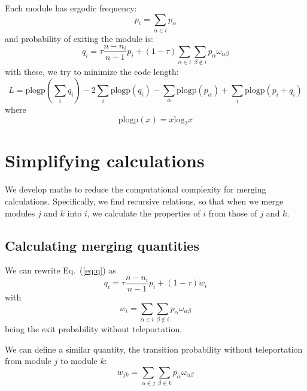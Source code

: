 \documentclass[12pt,a4paper]{article}
\begin{document}
Each module has ergodic frequency:
\begin{equation}
    p_i = \sum_{\alpha\in i}p_\alpha
\end{equation}
and probability of exiting the module is:
\begin{equation}
    q_i = \tau\frac{n-n_i}{n-1}p_i +(1-\tau)\sum_{\alpha\in i}\sum_{\beta\notin i}p_\alpha\omega_{\alpha\beta}
\label{eq:q}
\end{equation}
with these, we try to minimize the code length:
\begin{equation}
    L =
    \mathrm{plogp}\left( \sum_iq_i \right)
    -2\sum_i\mathrm{plogp}\left(q_i\right)
    -\sum_\alpha \mathrm{plogp}(p_\alpha)
    +\sum_i\mathrm{plogp}\left( p_i+q_i \right)
\label{eq:L}
\end{equation}
where
\begin{equation}
    \mathrm{plogp}(x) = x \mathrm{log}_2 x
\end{equation}

\section{Simplifying calculations}

We develop maths to reduce the computational complexity for merging calculations. Specifically, we find recursive relations, so that when we merge modules \(j\) and \(k\) into \(i\), we calculate the properties of \(i\) from those of \(j\) and \(k\).

\subsection{Calculating merging quantities}

We can rewrite Eq.~(\ref{eq:q}) as
\begin{equation}
    q_i = \tau\frac{n-n_i}{n-1}p_i +(1-\tau)w_i
\label{eq:q-simplified}
\end{equation}
with
\begin{equation}
    w_i = \sum_{\alpha\in i}\sum_{\beta\notin i}p_\alpha\omega_{\alpha\beta}
\end{equation}
being the exit probability without teleportation.

We can define a similar quantity, the transition probability without teleportation from module \(j\) to module \(k\):
\begin{equation}
    w_{jk} = \sum_{\alpha\in j}\sum_{\beta\in k}p_\alpha\omega_{\alpha\beta}
\end{equation}
\end{document}
